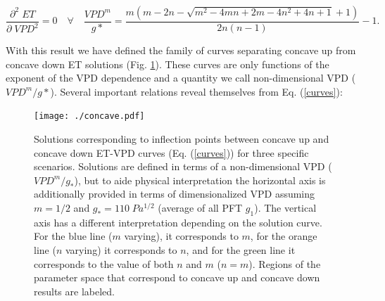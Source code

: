 \documentclass[hess, manuscript]{copernicus}
\providecommand{\DIFdelbegin}{} %
\providecommand{\DIFdelend}{} %
\begin{document}
\DIFdelend \begin{equation}
\frac{\partial^2 \; ET}{\partial \; VPD^2} = 0 \quad \forall \quad\frac{VPD^m}{g*} = \frac{m \left(m - 2 n - \sqrt{m^{2} - 4 m n + 2 m - 4 n^{2} + 4 n + 1} + 1\right)}{2 n \left(n - 1\right)} - 1.
\label{curves}
\end{equation}
 \DIFdelbegin %

\DIFdelend With this
result we have defined the family of curves separating concave up from
concave down ET solutions (Fig. \ref{concave}). These curves are
only functions of the exponent of the VPD dependence and a quantity we
call non-dimensional VPD ($VPD^m/g*$). Several important
relations reveal themselves from Eq. (\ref{curves}):

\begin{figure}
  \centering
  \centerline{\texttt{[image: ./concave.pdf]}}
  \caption{ Solutions corresponding to inflection points between
    concave up and concave down ET-VPD curves (Eq. (\ref{curves}))
    for three specific scenarios. Solutions are defined in terms of a
    non-dimensional VPD ($VPD^m/g_*$), but to aide physical
    interpretation the horizontal axis is additionally provided in terms of dimensionalized VPD assuming $m=1/2$ and
    $g_*=110\; Pa^{1/2}$ (average of all PFT $g_1$). The vertical axis
    has a different interpretation depending on the solution
    curve. For the blue line ($m$ varying), it corresponds to $m$,
    for the orange line ($n$ varying) it corresponds to $n$, and for
    the green line it corresponds to the value of both $n$ and $m$
    ($n=m$). Regions of the parameter space that correspond to
    concave up and concave down results are labeled.}
  \label{concave}
\end{figure}
\end{document}
